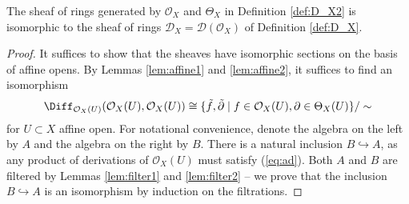 \begin{lemma}
    The sheaf of rings generated by $\mathcal{O}_X$ and $\Theta_X$ in Definition
    \ref{def:D_X2} is isomorphic to the sheaf of rings $\mathscr{D}_X=\mathscr{D}(\mathcal{O}_X)$
    of Definition \ref{def:D_X}.
\end{lemma}
\begin{proof}
    It suffices to show that the sheaves have isomorphic sections on the basis
    of affine opens. By Lemmas \ref{lem:affine1} and \ref{lem:affine2}, it suffices to
    find an isomorphism
    \[\Diff_{\mathcal{O}_X(U)}(\mathcal{O}_X(U),\mathcal{O}_X(U)) \cong \{\tilde f,\tilde \partial\mid f\in\mathcal{O}_X(U),\partial\in\Theta_X(U)\}/\sim\]
    for $U\subset X$ affine open. For notational convenience, denote the
    algebra on the left by $A$ and the algebra on the right by $B$. There is a
    natural inclusion $B\hookrightarrow A$, as any product of derivations of
    $\mathcal{O}_X(U)$ must satisfy (\ref{eq:ad}).
    Both $A$ and $B$ are filtered by Lemmas \ref{lem:filter1} and \ref{lem:filter2}
    -- we prove that the inclusion $B\hookrightarrow A$ is an isomorphism by
    induction on the filtrations. 
\end{proof}

